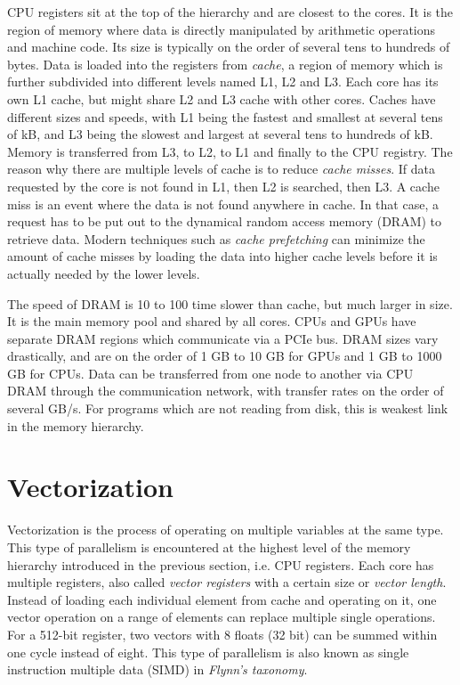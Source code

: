 CPU registers sit at the top of the hierarchy and are closest to the cores. It is the region of memory where data is directly manipulated by arithmetic operations and machine code. Its size is typically on the order of several tens to hundreds of bytes. Data is loaded into the registers from \emph{cache}, a region of memory which is further subdivided into different levels named L1, L2 and L3. Each core has its own L1 cache, but might share L2 and L3 cache with other cores. Caches have different sizes and speeds, with L1 being the fastest and smallest at several tens of kB, and L3 being the slowest and largest at several tens to hundreds of kB. Memory is transferred from L3, to L2, to L1 and finally to the CPU registry. The reason why there are multiple levels of cache is to reduce \emph{cache misses}. If data requested by the core is not found in L1, then L2 is searched, then L3. A cache miss is an event where the data is not found anywhere in cache. In that case, a request has to be put out to the dynamical random access memory (DRAM) to retrieve data. Modern techniques such as \emph{cache prefetching} can minimize the amount of cache misses by loading the data into higher cache levels before it is actually needed by the lower levels. 

The speed of DRAM is 10 to 100 time slower than cache, but much larger in size. It is the main memory pool and shared by all cores. CPUs and GPUs have separate DRAM regions which communicate via a PCIe bus. DRAM sizes vary drastically, and are on the order of 1 GB to 10 GB for GPUs and 1 GB to 1000 GB for CPUs. Data can be transferred from one node to another via CPU DRAM through the communication network, with transfer rates on the order of several GB/s. For programs which are not reading from disk, this is weakest link in the memory hierarchy.

\section{Vectorization}

Vectorization is the process of operating on multiple variables at the same type. This type of parallelism is encountered at the highest level of the memory hierarchy introduced in the previous section, i.e. CPU registers. Each core has multiple registers, also called \emph{vector registers} with a certain size or \emph{vector length}. Instead of loading each individual element from cache and operating on it, one vector operation on a range of elements can replace multiple single operations. For a 512-bit register, two vectors with 8 floats (32 bit) can be summed within one cycle instead of eight. This type of parallelism is also known as single instruction multiple data (SIMD) in \emph{Flynn's taxonomy}.


